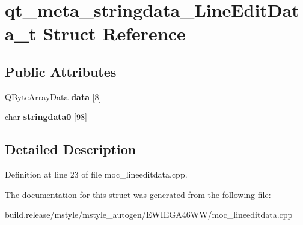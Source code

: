 \hypertarget{structqt__meta__stringdata___line_edit_data__t}{}\section{qt\+\_\+meta\+\_\+stringdata\+\_\+\+Line\+Edit\+Data\+\_\+t Struct Reference}
\label{structqt__meta__stringdata___line_edit_data__t}
\subsection*{Public Attributes}
\begin{DoxyCompactItemize}
\item 
\mbox{\label{structqt__meta__stringdata___line_edit_data__t_ae6f9b0d11ff10256625be8f8f3503136}} 
Q\+Byte\+Array\+Data {\bfseries data} \mbox{[}8\mbox{]}
\item 
\mbox{\label{structqt__meta__stringdata___line_edit_data__t_a94fe4fb50dd4fe2e6bf8f278a1aa6593}} 
char {\bfseries stringdata0} \mbox{[}98\mbox{]}
\end{DoxyCompactItemize}


\subsection{Detailed Description}


Definition at line 23 of file moc\+\_\+lineeditdata.\+cpp.



The documentation for this struct was generated from the following file\+:\begin{DoxyCompactItemize}
\item 
build.\+release/mstyle/mstyle\+\_\+autogen/\+E\+W\+I\+E\+G\+A46\+W\+W/moc\+\_\+lineeditdata.\+cpp\end{DoxyCompactItemize}
